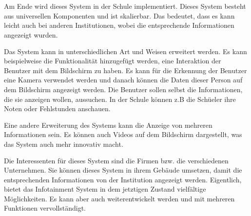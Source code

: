 \chapter{\docname}
\label{\docname}
Am Ende wird dieses System in der Schule implementiert. Dieses System besteht aus universellen Komponenten und ist skalierbar. Das bedeutet, dass es kann leicht auch bei anderen Institutionen, wobei die entsprechende Informationen angezeigt wurden. 

Das System kann in unterschiedlichen Art und Weisen erweitert werden. Es kann beispielweise die Funktionalit\"at hinzugef\"ugt werden, eine Interaktion der Benutzer mit dem Bildschirm zu haben. Es kann f\"ur die Erkennung der Benutzer eine Kamera verwendet werden und danach k\"onnen die Daten dieser Person auf dem Bildschirm angezeigt werden. Die Benutzer sollen selbst die Informationen, die sie anzeigen wollen, aussuchen. In der Schule k\"onnen z.B die Sch\"ueler ihre Noten oder Fehlstunden anschauen. 

Eine andere Erweiterung des Systems kann die Anzeige von mehreren Informationen sein. Es k\"onnen auch Videos auf dem Bildschirm dargestellt, was das System auch mehr innovativ macht. 

Die Interessenten f\"ur dieses System sind die Firmen bzw. die verschiedenen Unternehmen. Sie k\"onnen dieses System in ihrem Geb\"aude umsetzen, damit die entsprechenden Informationen von der Institution angezeigt werden. 
Eigentlich, bietet das Infotainment System in dem jetztigen Zustand vielf\"altige M\"oglichkeiten. Es kann aber auch weiterentwickelt werden und mit mehreren Funktionen vervollst\"andigt.

